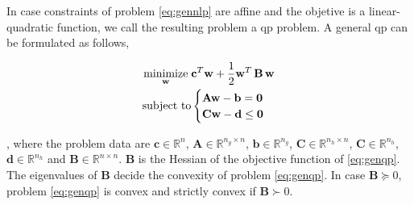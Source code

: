 \begin{definition}[\acrlong{qp}]
In case constraints of problem \ref{eq:gennlp} are affine and the objetive is a linear-quadratic function, we call the resulting problem a \acrlong{qp} problem. A general \acrshort{qp} can be formulated as follows,

\begin{equation}
\begin{aligned}
	\underset{\mathbf{w}}{\text{minimize}} \hspace{1mm} & \mathbf{c}^T \mathbf{w} + \frac{1}{2} \mathbf{w}^T \, \mathbf{B} \, \mathbf{w}\\
	\text{subject to} &
	\begin{cases}
		\mathbf{A} \mathbf{w} - \mathbf{b} = \mathbf{0}\\
		\mathbf{C} \mathbf{w} - \mathbf{d} \leq \mathbf{0}
	\end{cases}
\end{aligned}
\label{eq:genqp}
\end{equation}

\noindent, where the problem data are $\mathbf{c} \in \mathbb{R}^n$, $\mathbf{A} \in \mathbb{R}^{n_g \times n}$, $\mathbf{b} \in \mathbb{R}^{n_g}$, $\mathbf{C} \in \mathbb{R}^{n_h \times n}$, $\mathbf{C} \in \mathbb{R}^{n_h}$, $\mathbf{d} \in \mathbb{R}^{n_h}$ and $\mathbf{B} \in \mathbb{R}^{n \times n}$. $\mathbf{B}$ is the Hessian of the objective function of \ref{eq:genqp}. The eigenvalues of $\mathbf{B}$ decide the convexity of problem \ref{eq:genqp}. In case $\mathbf{B} \succeq 0$, problem \ref{eq:genqp} is convex and strictly convex if $\mathbf{B} \succ 0$.
\end{definition}

